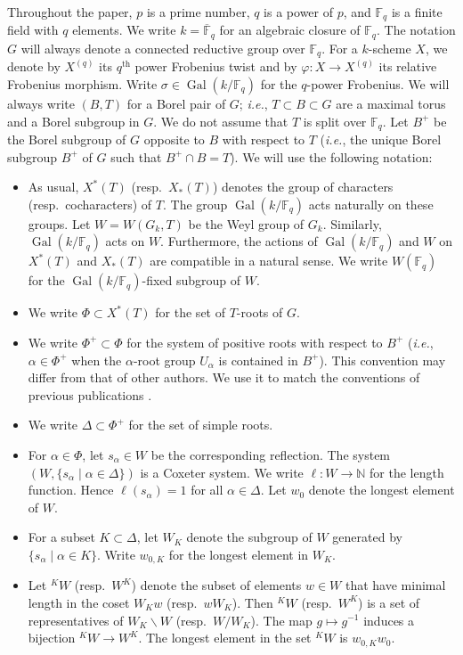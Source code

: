 \documentclass[10pt,a4paper]{article}
\numberwithin{equation}{section}
\theoremstyle{definition}
\theoremstyle{remark}
\newcommand{\FF}{\mathbb{F}}
\newcommand{\NN}{\mathbb{N}}
\DeclareMathOperator{\Gal}{Gal}
\newcommand{\supth}[1]{\ensuremath{#1^{\mathrm{th}}}}
\begin{document}
Throughout the paper, $p$ is a prime number, $q$ is a power of $p$, and $\FF_q$ is a finite field with $q$ elements. We write $k=\overline{\FF}_q$ for an algebraic closure of $\FF_q$. The notation $G$ will always denote a connected reductive group over $\FF_q$. For a $k$-scheme $X$, we denote by $X^{(q)}$ its $\supth{q}$ power Frobenius twist and by $\varphi \colon X\to X^{(q)}$ its relative Frobenius morphism. Write $\sigma \in \Gal(k/\FF_q)$ for the $q$-power Frobenius. We will always write $(B,T)$ for a Borel pair of $G$; \textit{i.e.}, $T \subset B \subset G$ are 
a maximal torus and a Borel subgroup in $G$. We do not assume that $T$ is split over $\FF_q$. Let $B^+$ be the Borel subgroup of $G$  opposite to $B$ with respect to $T$ (\textit{i.e.}, the unique Borel subgroup $B^+$ of $G$ such that $B^+\cap B=T$). We will use the following notation: 
\begin{itemize}
\item As usual, $X^*(T)$ (resp.~$X_*(T)$) denotes the group of characters (resp.~cocharacters) of $T$. The group $\Gal(k/\FF_q)$ acts naturally on these groups. Let $W=W(G_k,T)$ be the Weyl group of $G_k$. Similarly, $\Gal(k/\FF_q)$ acts on $W$. Furthermore, the actions of $\Gal(k/\FF_q)$ and $W$ on $X^*(T)$ and $X_*(T)$ are compatible in a natural sense. We write $W(\FF_q)$ for the $\Gal(k/\FF_q)$-fixed subgroup of $W$. 
\item We write $\Phi\subset X^*(T)$ for the set of $T$-roots of $G$.
\item We write $\Phi^+\subset \Phi$ for the system of positive roots with respect to $B^+$ (\textit{i.e.}, $\alpha \in \Phi^+$ when the $\alpha$-root group $U_{\alpha}$ is contained in $B^+$). This convention may differ from that of other authors. We use it to match the conventions of previous publications \cite{Goldring-Koskivirta-Strata-Hasse,Koskivirta-automforms-GZip}.
\item We write $\Delta\subset \Phi^+$ for the set of simple roots. 
\item For $\alpha \in \Phi$, let $s_\alpha \in W$ be the corresponding reflection. The system $(W,\{s_\alpha \mid \alpha \in \Delta\})$ is a Coxeter system. 
We write $\ell  \colon W\to \NN$ for the length function. Hence $\ell(s_\alpha)=1$ for all $\alpha\in \Delta$. Let $w_0$ denote the longest element of $W$.
\item For a subset $K\subset \Delta$, let $W_K$ denote the subgroup of $W$ generated by $\{s_\alpha \mid \alpha \in K\}$. Write $w_{0,K}$ for the longest element in $W_K$.
\item Let ${}^KW$ (resp.~$W^K$) denote the subset of elements $w\in W$ that have minimal length in the coset $W_K w$ (resp.~$wW_K$). Then ${}^K W$ (resp.\ $W^K$) is a set of representatives of $W_K\backslash W$ (resp.\ $W/W_K$). The map $g\mapsto g^{-1}$ induces a bijection ${}^K W\to W^K$. The longest element in the set ${}^K W$ is $w_{0,K} w_0$.

\end{itemize}
\end{document}
